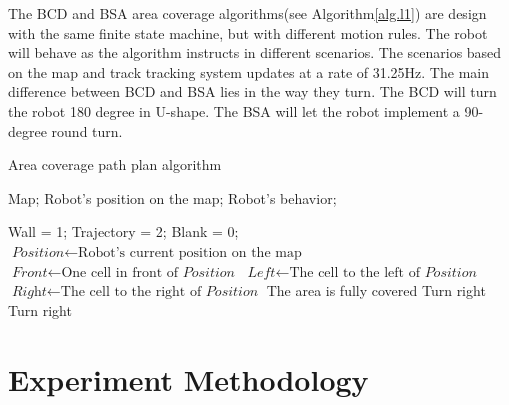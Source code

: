 \documentclass[conference]{IEEEtran}
\begin{document}
The BCD and BSA area coverage algorithms(see Algorithm\ref{alg.l1}) are design with the same finite state machine, but with different motion rules. The robot will behave as the algorithm instructs in different scenarios. The scenarios based on the map and track tracking system updates at a rate of 31.25Hz. The main difference between BCD and BSA lies in the way they turn. The BCD will turn the robot 180 degree in U-shape. The BSA will let the robot implement a 90-degree round turn. 


\begin{algorithm}[h]
 \caption{Area coverage path plan algorithm}
 \label{alg.l1}
 \begin{algorithmic}[1]
 \Require
 Map; Robot's position on the map;
 \Ensure
 Robot's behavior;
 
    \STATE Wall = 1;
    \STATE Trajectory = 2;
    \STATE Blank = 0;
    \STATE $\textit{Position} \gets \text{Robot's current position on the map}$
    \STATE $\textit{Front} \gets \text{One cell in front of } \textit{Position}$
    \STATE $\textit{Left} \gets \text{The cell to the left of } \textit{Position}$
    \STATE $\textit{Right} \gets \text{The cell to the right of } \textit{Position}$
    {
            {
                {The area is fully covered}
            {\ELSE}
                {Turn right}
            \ENDIF
        {
            {Turn right}}
        \ENDIF}
  \ENDIF}
  \label{code:recentEnd}
 \end{algorithmic}
\end{algorithm}

\section{Experiment Methodology}
\end{document}
